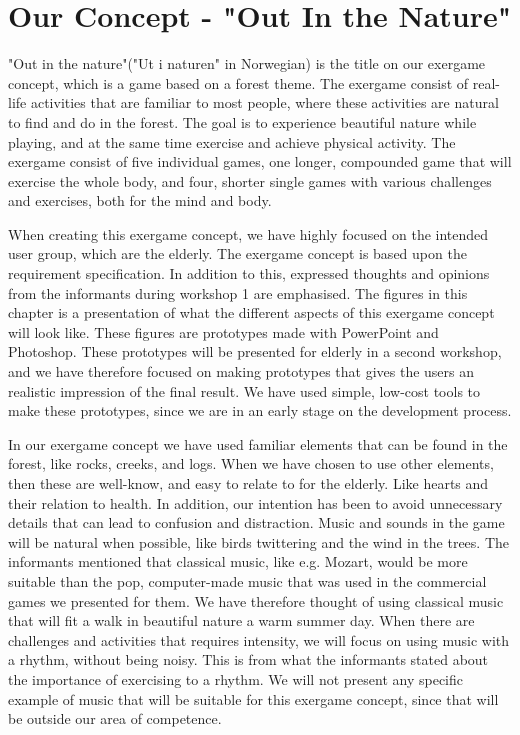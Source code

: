 \section{Our Concept - "Out In the Nature"}
\label{sec:outinthenature}

"Out in the nature"("Ut i naturen" in Norwegian) is the title on our exergame concept, which is a game based on a forest theme. The exergame consist of real-life activities that are familiar to most people, where these activities are natural to find and do in the forest. The goal is to experience beautiful nature while playing, and at the same time exercise and achieve physical activity. The exergame consist of five individual games, one longer, compounded game that will exercise the whole body, and four, shorter single games with various challenges and exercises, both for the mind and body.    

When creating this exergame concept, we have highly focused on the intended user group, which are the elderly. The exergame concept is based upon the requirement specification. In addition to this, expressed thoughts and opinions from the informants during workshop 1 are emphasised. The figures in this chapter is a presentation of what the different aspects of this exergame concept will look like. These figures are prototypes made with PowerPoint and Photoshop. These prototypes will be presented for elderly in a second workshop, and we have therefore focused on making prototypes that gives the users an realistic impression of the final result. We have used simple, low-cost tools to make these prototypes, since we are in an early stage on the development process.     

In our exergame concept we have used familiar elements that can be found in the forest, like rocks, creeks, and logs. When we have chosen to use other elements, then these are well-know, and easy to relate to for the elderly. Like hearts and their relation to health. In addition, our intention has been to avoid unnecessary details that can lead to confusion and distraction. Music and sounds in the game will be natural when possible, like birds twittering and the wind in the trees. The informants mentioned that classical music, like e.g. Mozart, would be more suitable than the pop, computer-made music that was used in the commercial games we presented for them. We have therefore thought of using classical music that will fit a walk in beautiful nature a warm summer day. When there are challenges and activities that requires intensity, we will focus on using music with a rhythm, without being noisy. This is from what the informants stated about the importance of exercising to a rhythm. We will not present any specific example of music that will be suitable for this exergame concept, since that will be outside our area of competence. 

